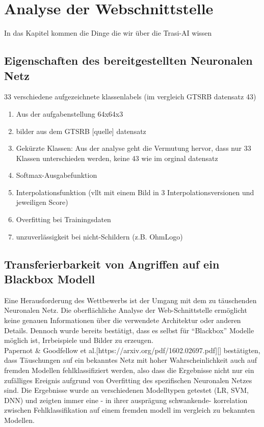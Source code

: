 \chapter{Analyse der Webschnittstelle}
\label{cha:TrasiAnalyse}
In das Kapitel kommen die Dinge die wir über die Trasi-AI wissen
\section{Eigenschaften des bereitgestellten Neuronalen Netz}
\label{sec:TrainingsDaten}




33 verschiedene aufgezeichnete klassenlabels (im vergleich GTSRB datensatz 43)

\begin{enumerate}
	\item 
	Aus der aufgabenstellung 64x64x3
	\item 
	bilder aus dem GTSRB [quelle] datensatz
	\item Gekürzte Klassen: Aus der analyse geht die Vermutung hervor, dass nur 33 Klassen unterschieden werden, keine 43 wie im orginal datensatz
	\item Softmax-Ausgabefunktion 
	\item Interpolationsfunktion (vllt mit einem Bild in 3 Interpolationsversionen und jeweiligen Score) 
	\item Overfitting bei Trainingsdaten
	\item unzuverlässigkeit bei nicht-Schildern (z.B. OhmLogo)
\end{enumerate}

\section{Transferierbarkeit von Angriffen auf ein Blackbox Modell}


\label{sec:TrasiModell}
Eine Herausforderung des Wettbewerbs ist der Umgang mit dem zu täuschenden Neuronalen Netz. Die oberflächliche Analyse der Web-Schnittstelle ermöglicht keine genauen Informationen über die verwendete Architektur oder anderen Details. Dennoch wurde bereits bestätigt, dass es selbst für “Blackbox” Modelle möglich ist, Irrbeispiele und Bilder zu erzeugen. 
\\Papernot & Goodfellow et al.[https://arxiv.org/pdf/1602.02697.pdf][] bestätigten, dass Täuschungen auf ein bekanntes Netz mit hoher Wahrscheinlichkeit auch auf fremden Modellen fehlklassifiziert werden, also dass die Ergebnisse nicht nur ein zufälliges Ereignis aufgrund von Overfitting des spezifischen Neuronalen Netzes sind. Die Ergebnisse wurde an verschiedenen Modelltypen getestet (LR, SVM, DNN) und zeigten immer eine - in ihrer ausprägung schwankende- korrelation zwischen Fehlklassifikation auf einem fremden modell im vergleich zu bekannten Modellen. 

